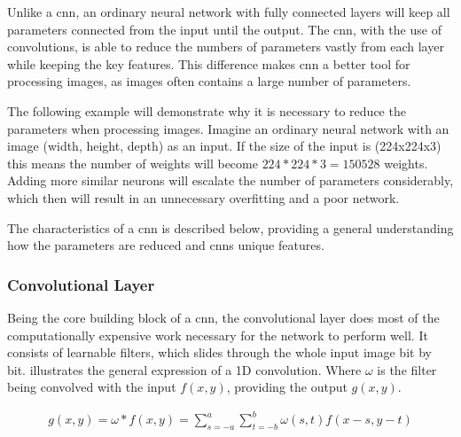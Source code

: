 \documentclass[USenglish]{ifimaster}  %
\begin{document}
Unlike a \ac{cnn}, an ordinary neural network with fully connected layers will keep all parameters connected from the input until the output. The \ac{cnn}, with the use of convolutions, is able to reduce the numbers of parameters vastly from each layer while keeping the key features. This difference makes \ac{cnn} a better tool for processing images, as images often contains a large number of parameters. 

The following example will demonstrate why it is necessary to reduce the parameters when processing images. Imagine an ordinary neural network with an image (width, height, depth) as an input. If the size of the input is (224x224x3) this means the number of weights will become $224 * 224 * 3 = 150528$ weights. Adding more similar neurons will escalate the number of parameters considerably, which then will result in an unnecessary overfitting and a poor network.

The characteristics of a \ac{cnn} is described below, providing a general understanding how the parameters are reduced and \acp{cnn} unique features.

\subsubsection{Convolutional Layer}
Being the core building block of a \ac{cnn}, the convolutional layer does most of the computationally expensive work necessary for the network to perform well. It consists of learnable filters, which slides through the whole input image bit by bit.  illustrates the general expression of a 1D convolution. Where $\omega$ is the filter being convolved with the input $f(x,y)$, providing the output $g(x,y)$. 

\begin{equation}\label{eq:conv}
\begin{aligned}
g(x,y) = \omega * f(x,y) = \sum_{s=-a}^{a}\sum_{t=-b}^{b}\omega(s,t)f(x-s,y-t)
\end{aligned}
\end{equation}
\end{document}
